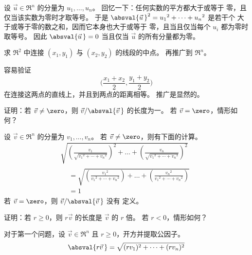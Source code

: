 \begin{exercises}
\begin{answer}
      设 \( \vec{u}\in\Re^n \) 的分量为 \( u_1,\ldots,u_n \)。
      回忆一下：任何实数的平方都大于或等于
      零，且仅当该实数为零时才取等号。
      于是
      \( \absval{\vec{u}\,}^2={u_1}^2+\cdots+{u_n}^2 \) 是若干个
      大于或等于零的数之和，因而它本身也大于或等于
      零，且当且仅当每个 \( u_i \) 都为零时取等号。
      因此 \( \absval{\vec{u}\,}=0 \) 当且仅当
      \( \vec{u} \) 的所有分量都为零。    
    \end{answer}
  \recommended \item 
    求 \( \Re^2 \) 中连接
    \( (x_1,y_1) \) 与 \( (x_2,y_2) \) 的线段的中点。
    再推广到 \( \Re^n \)。
    \begin{answer}
      容易验证
      \begin{equation*}
        \bigl( \frac{x_1+x_2}{2},\frac{y_1+y_2}{2}  \bigr)
      \end{equation*}
      在连接这两点的直线上，并且到两点的距离相等。
      推广是显然的。  
    \end{answer}
  \item 
    证明：若 \( \vec{v}\neq\zero \)，则
    \( \vec{v}/\absval{\vec{v}\,} \) 的长度为一。
    若 \( \vec{v}=\zero \)，情形如何？
    \begin{answer}
      设 \( \vec{v}\in\Re^n \) 的分量为 \( v_1,\ldots,v_n \)。
      若 \( \vec{v}\neq \zero \)，则有下面的计算。
      \begin{multline*}
        \sqrt{\left(\frac{v_1}{\sqrt{{v_1}^2+\cdots+{v_n}^2}}\right)^2+
              \dots+\left(\frac{v_n}{\sqrt{{v_1}^2+\cdots+{v_n}^2}}\right)^2}
        \\
        \begin{aligned}
          &=\sqrt{\left(\frac{{v_1}^2}{{v_1}^2+\cdots+{v_n}^2}\right)+
              \dots+\left(\frac{{v_n}^2}{{v_1}^2+\cdots+{v_n}^2}\right)}   \\
          &=1
        \end{aligned}
      \end{multline*}
      若 \( \vec{v}=\zero \)，则 \( \vec{v}/\absval{\vec{v}\,} \) 没有
      定义。
    \end{answer}
  \item 
     证明：若 \( r\geq 0 \)，则
     \( r\vec{v} \) 的长度是 \( \vec{v} \) 的
     \( r \) 倍。
     若 \( r< 0 \)，情形如何？
    \begin{answer}
      对于第一个问题，设 \( \vec{v}\in\Re^n \) 且
      \( r\geq 0 \)，开方并提取公因子。
      \begin{equation*}
        \absval{r\vec{v}\,}
        =\sqrt{(rv_1)^2+\cdots+(rv_n)^2}     

\end{equation*}
\end{answer}
\end{exercises}
